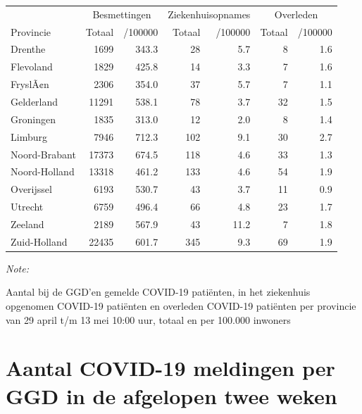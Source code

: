 \documentclass[
  english,
  man,floatsintext]{apa6}
\begin{document}
\begin{table}
\centering
\begin{threeparttable}
\begin{tabular}{lrrrrrr}
\toprule
\multicolumn{1}{c}{ } & \multicolumn{2}{c}{Besmettingen} & \multicolumn{2}{c}{Ziekenhuisopnames} & \multicolumn{2}{c}{Overleden} \\
\cmidrule(l{3pt}r{3pt}){2-3} \cmidrule(l{3pt}r{3pt}){4-5} \cmidrule(l{3pt}r{3pt}){6-7}
Provincie & Totaal & /100000 & Totaal & /100000 & Totaal & /100000\\
\midrule
Drenthe & 1699 & 343.3 & 28 & 5.7 & 8 & 1.6\\
Flevoland & 1829 & 425.8 & 14 & 3.3 & 7 & 1.6\\
FryslÃ¢n & 2306 & 354.0 & 37 & 5.7 & 7 & 1.1\\
Gelderland & 11291 & 538.1 & 78 & 3.7 & 32 & 1.5\\
Groningen & 1835 & 313.0 & 12 & 2.0 & 8 & 1.4\\
Limburg & 7946 & 712.3 & 102 & 9.1 & 30 & 2.7\\
Noord-Brabant & 17373 & 674.5 & 118 & 4.6 & 33 & 1.3\\
Noord-Holland & 13318 & 461.2 & 133 & 4.6 & 54 & 1.9\\
Overijssel & 6193 & 530.7 & 43 & 3.7 & 11 & 0.9\\
Utrecht & 6759 & 496.4 & 66 & 4.8 & 23 & 1.7\\
Zeeland & 2189 & 567.9 & 43 & 11.2 & 7 & 1.8\\
Zuid-Holland & 22435 & 601.7 & 345 & 9.3 & 69 & 1.9\\
\bottomrule
\end{tabular}
\begin{tablenotes}
\item \textit{Note: } 
\item Aantal bij de GGD’en gemelde COVID-19 patiënten, in het ziekenhuis opgenomen COVID-19 patiënten en overleden COVID-19 patiënten per provincie van 29 april t/m 13 mei 10:00 uur, totaal en per 100.000 inwoners
\end{tablenotes}
\end{threeparttable}
\end{table}

\newpage

\hypertarget{aantal-covid-19-meldingen-per-ggd-in-de-afgelopen-twee-weken}{%
\section{Aantal COVID-19 meldingen per GGD in de afgelopen twee weken}\label{aantal-covid-19-meldingen-per-ggd-in-de-afgelopen-twee-weken}}
\end{document}
